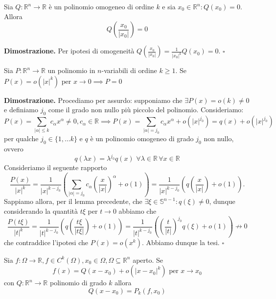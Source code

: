 \vspace{0.5cm}
\begin{cor}
Sia $Q: \mathbb{R}^n \to \mathbb{R}$ è un polinomio omogeneo di ordine $k$ e sia $x_0 \in \mathbb{R}^n : Q(x_0) = 0$. Allora
$$
Q \left( \frac{x_0}{|x_0|} \right) = 0
$$
\end{cor}

\noindent \textbf{Dimostrazione. }
Per ipotesi di omogeneità $Q(\frac{x_0}{|x_0|}) = \frac{1}{|x_0|^k}Q(x_0) = 0$.
\hfill $\square$

\vspace{0.5cm}
\begin{lemma}
Sia $P:\mathbb{R}^n \to \mathbb{R}$ un polinomio in $n$-variabili di ordine $k \geq 1$. Se $P(x) = o(|x|^k) \text{ per } x \to 0 \implies P = 0$
\end{lemma}

\noindent \textbf{Dimostrazione. }
Procediamo per assurdo: supponiamo che $\exists P(x) = o(k) \neq 0$ e definiamo $j_0$ come il grado non nullo più piccolo del polinomio. Consideriamo:
$$
P(x) = \sum_{|\alpha| \leq k} c_{\alpha}x^{\alpha} \neq 0, c_{\alpha} \in \mathbb{R} \implies P(x) = \sum_{|\alpha| = j_0} c_{\alpha} x^{\alpha} + o(|x|^{j_0}) = q(x) + o(|x|^{j_0})
$$
per qualche $j_0 \in \{1, \ldots k \}$ e $q$ è un polinomio omogeneo di grado $j_0$ non nullo, ovvero 
$$
q(\lambda x) = \lambda^{j_0} q(x) \, \, \forall \lambda \in \mathbb{R} \, \forall x \in \mathbb{R}
$$
Consideriamo il seguente rapporto
$$
\frac{P(x)}{|x|^k} = \frac{1}{|x|^{k-j_0}} \left(\sum_{|\alpha|=j_0} c_{\alpha} \left( \frac{x}{|x|} \right)^{\alpha} + o(1) \right) = \frac{1}{|x|^{k-j_0}} \left( q \left( \frac{x}{|x|} \right)+o(1) \right).
$$
Sappiamo allora, per il lemma precedente, che $\exists \xi \in \mathbb{S}^{n-1}: q(\xi) \neq 0$, dunque considerando la quantità $t\xi$ per $t \to 0$ abbiamo che
$$
\frac{P(t\xi)}{|t|^k} = \frac{1}{|t|^{k-j_0}} \left( q \left(\frac{t\xi}{|t\xi|}\right) + o(1) \right) = \frac{1}{|t|^{k-j_0}} \left( \left( \frac{t}{|t|} \right)^{j_0} q(\xi) + o(1) \right) \not\to 0
$$
che contraddice l'ipotesi che $P(x) = o(x^k)$. Abbiamo dunque la tesi.
\hfill $\square$

\vspace{0.5cm}
\begin{theorem}[\textcolor{blue}{unicità del polinomio di Taylor}]
Sia $f: \Omega \to \mathbb{R}, f \in C^k(\Omega), x_0 \in \Omega, \Omega \subseteq \mathbb{R}^n$ aperto. Se
$$
f(x) = Q(x-x_0) + o(|x-x_0|^k) \text{ per } x \to x_0
$$
con $Q: \mathbb{R}^n \to \mathbb{R}$ polinomio di grado $k$ allora
$$
Q(x - x_0) = P_k(f, x_0)
$$
\end{theorem}


